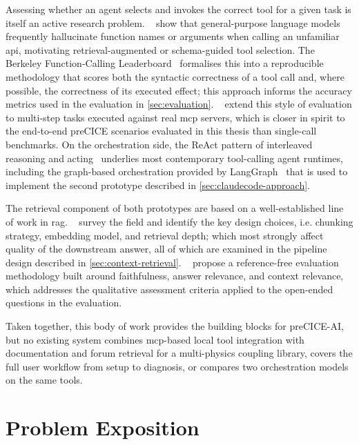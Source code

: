 \documentclass[
  numbers=noenddot,
  english,
  a4paper,
  twoside,
  bibliography=totoc,
  headsepline,
  cleardoublepage=empty,
  parskip=half,
  draft=false
]{scrbook}
\theoremstyle{break}
\renewcommand{\_}{\textunderscore\allowbreak}
\begin{document}
Assessing whether an agent selects and invokes the correct tool for a given task is itself an
active research problem.
\citeauthor{patil2023gorilla}~\cite{patil2023gorilla} show that general-purpose language models
frequently hallucinate function names or arguments when calling an unfamiliar \gls{api},
motivating retrieval-augmented or schema-guided tool selection.
The Berkeley Function-Calling Leaderboard~\cite{patil2025bfcl} formalises this into a
reproducible methodology that scores both the syntactic correctness of a tool call and, where
possible, the correctness of its executed effect; this approach informs the accuracy metrics
used in the evaluation in \cref{sec:evaluation}.
\citeauthor{wang2025mcpbench}~\cite{wang2025mcpbench} extend this style of evaluation to
multi-step tasks executed against real \gls{mcp} servers, which is closer in spirit to the
end-to-end preCICE scenarios evaluated in this thesis than single-call benchmarks.
On the orchestration side, the ReAct pattern of interleaved reasoning and acting~\cite{yao2023react}
underlies most contemporary tool-calling agent runtimes, including the graph-based
orchestration provided by LangGraph~\cite{langgraph2024} that is used to implement the second
prototype described in \cref{sec:claudecode-approach}.

The retrieval component of both prototypes are based on a well-established line of work in
\gls{rag}.
\citeauthor{gao2023retrieval}~\cite{gao2023retrieval} survey the field and identify the key
design choices, i.e. chunking strategy, embedding model, and retrieval depth; which most
strongly affect quality of the downstream answer, all of which are examined in the pipeline design
described in \cref{sec:context-retrieval}.
\citeauthor{es2023ragas}~\cite{es2023ragas} propose a reference-free evaluation methodology
built around faithfulness, answer relevance, and context relevance, which addresses the
qualitative assessment criteria applied to the open-ended questions in the evaluation.

Taken together, this body of work provides the building blocks for preCICE-AI, but no existing system
combines \gls{mcp}-based local tool integration with documentation and forum retrieval for a
multi-physics coupling library, covers the full user workflow from setup to diagnosis, or compares
two orchestration models on the same tools.

\chapter{Problem Exposition}\label{sec:problem-exposition}
\end{document}
